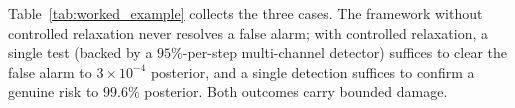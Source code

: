 Table~\ref{tab:worked_example} collects the three cases.  The
framework without controlled relaxation never resolves a false
alarm; with controlled relaxation, a single test (backed by a
$95\%$-per-step multi-channel detector) suffices to clear the
false alarm to $3 \times 10^{-4}$ posterior, and a single
detection suffices to confirm a genuine risk to $99.6\%$
posterior.  Both outcomes carry bounded damage.
